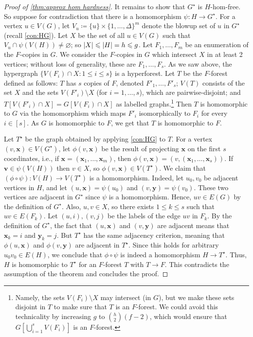 \documentclass[10pt,a4paper]{amsart}
\DeclarePairedDelimiter{\abs}{\lvert}{\rvert}
\newcommand{\bx}{\mathbf{x}}
\newcommand{\by}{\mathbf{y}}
\renewcommand{\emptyset}{\varnothing}
\renewcommand{\leq}{\leqslant}
\begin{document}
\begin{proof}[Proof of \cref{thm:approx hom hardness}]
	It remains to show that $G^{\star}$ is $H$-hom-free. So suppose for contradiction that there is a homomorphism $\psi:H \to G^\star$. 
	For a vertex $u \in V(G)$, let $V_u \coloneqq \{u\} \times \{1,\dots,\Delta\}^m$ denote the blowup set of $u$ in $G^{\star}$ (recall \cref{con:HG}).  
	Let $X$ be the set of all $u \in V(G)$ such that $V_u \cap \psi(V(H)) \neq \emptyset$; so $\abs X \leq \abs H = h \leq g$. 
    Let $F_1,\dots,F_m$ be an enumeration of the $F$-copies in $G$. We consider the $F$-copies in $G$ which intersect $X$ in at least 2 vertices; without loss of generality, these are 
   $F_1,\dots,F_s$. As we saw above, the hypergraph 
    $\{V(F_i) \cap X : 1 \leq i \leq s\}$ is a hyperforest. 
    Let $T$ be the $F$-forest defined as follows: $T$ has $s$ copies of $F$, denoted $F'_1,\dots,F'_s$; $V(T)$ consists of the set $X$ and the sets $V(F'_i) \setminus X$ (for $i = 1,\dots,s$), which are pairwise-disjoint; and $T[V(F'_i) \cap X] = G[V(F_i) \cap X]$ as labelled graphs.\footnote{Namely, the sets $V(F_i)\setminus X$ may intersect (in $G$), but we make these sets disjoint in $T$ to make sure that $T$ is an $F$-forest. We could avoid this technicality by increasing $g$ to $\binom{h}{2}(f-2)$, which would ensure that $G[\bigcup_{i=1}^s V(F_i)]$ is an $F$-forest.}
    Then $T$ is homomorphic to $G$ via the homomorphism which maps $F'_i$ isomorphically to $F_i$ for every $i \in [s]$. As $G$ is homomorphic to $F$, we get that $T$ is homomorphic to $F$.
    
	Let $T^{\star}$ be the graph obtained by applying \cref{con:HG} to $T$. For a vertex $(v,\bx) \in V(G^{\star})$, let $\phi(v,\bx)$ be the result of projecting $\bx$ on the first $s$ coordinates, i.e., if $\bx = (\bx_1,\dots,\bx_m)$, then $\phi(v,\bx) = (v,(\bx_1,\dots,\bx_s))$. If $\mathbf{v} \in \psi(V(H))$ then $v \in X$, so $\phi(v,\bx) \in V(T^{\star})$. We claim that $(\phi \circ \psi) : V(H) \rightarrow V(T^{\star})$ is a homomorphism. Indeed, let $u_0,v_0$ be adjacent vertices in $H$, and let $(u,\bx)=\psi(u_0)$ and $(v,\by) = \psi(v_0)$. These two vertices are adjacent in $G^\star$ since $\psi$ is a homomorphism. Hence, $uv \in E(G)$ by the definition of $G^{\star}$. Also, $u,v \in X$, so there exists 
    $1 \leq k \leq s$ such that $uv \in E(F_k)$. Let $(u,i),(v,j)$ be the labels of the edge $uv$ in $F_k$. By the definition of $G^{\star}$, the fact that $(u,\bx)$ and $(v,\by)$ are adjacent means that $\bx_k = i$ and $\by_k = j$. But $T^{\star}$ has the same adjacency criterion, meaning that $\phi(u,\bx)$ and $\phi(v,\by)$ are adjacent in $T^{\star}$. Since this holds for arbitrary $u_0 v_0 \in E(H)$, we conclude that $\phi \circ \psi$ is indeed a homomorphism $H \to T^\star$. 
    Thus, $H$ is homomorphic to $T^\star$ for an $F$-forest $T$ with $T \rightarrow F$.
    This contradicts the assumption of the theorem and concludes the proof.
	\end{proof}
\end{document}
